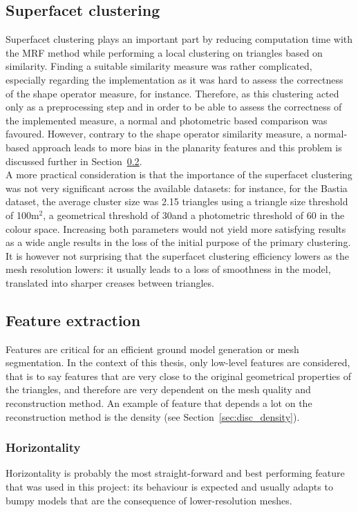 \documentclass{kththesis}
\begin{document}
\subsection{Superfacet clustering}
Superfacet clustering plays an important part by reducing computation time with the MRF method while performing a local clustering on triangles based on similarity. Finding a suitable similarity measure was rather complicated, especially regarding the implementation as it was hard to assess the correctness of the shape operator measure, for instance. Therefore, as this clustering acted only as a preprocessing step and in order to be able to assess the correctness of the implemented measure, a normal and photometric based comparison was favoured.  However, contrary to the shape operator similarity measure, a normal-based approach leads to more bias in the planarity features and this problem is discussed further in Section~\ref{sec:ft_extr}. \\ 
A more practical consideration is that the importance of the superfacet clustering was not very significant across the available datasets: for instance, for the Bastia dataset, the average cluster size was 2.15 triangles using a triangle size threshold of 100m$^2$, a geometrical threshold of 30\degree and a photometric threshold of 60 in the colour space. Increasing both parameters would not yield more satisfying results as a wide angle results in the loss of the initial purpose of the primary clustering. It is however not surprising that the superfacet clustering efficiency lowers as the mesh resolution lowers: it usually leads to a loss of smoothness in the model, translated into sharper creases between triangles. 

\subsection{Feature extraction}
\label{sec:ft_extr}
Features are critical for an efficient ground model generation or mesh segmentation. In the context of this thesis, only low-level features are considered, that is to say features that are very close to the original geometrical properties of the triangles, and therefore are very dependent on the mesh quality and reconstruction method. An example of feature that depends a lot on the reconstruction method is the density (see Section~\ref{sec:disc_density}). \\ 
\subsubsection{Horizontality}
Horizontality is probably the most straight-forward and best performing feature that was used in this project: its behaviour is expected and usually adapts to bumpy models that are the consequence of lower-resolution meshes.  
\end{document}

